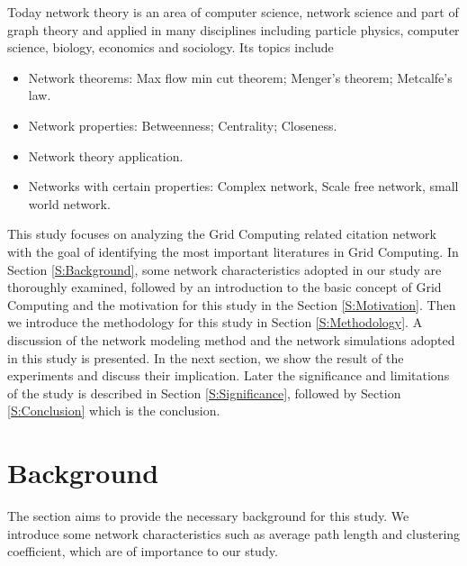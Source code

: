 Today network theory \cite{www-network} is an area of computer science, network science and part of graph theory and applied in many disciplines including particle physics, computer science, biology, economics and sociology. Its topics include

\begin {itemize}
\item Network theorems: Max flow min cut theorem; Menger's theorem; Metcalfe's law.
\item Network properties: Betweenness; Centrality; Closeness.
\item Network theory application.
\item Networks with certain properties: Complex network, Scale free network, small world network. 
\end {itemize}

This study focuses on analyzing the Grid Computing related citation network with the goal of identifying the most important literatures in Grid Computing. In Section \ref{S:Background}, some network characteristics adopted in our study are thoroughly examined, followed by an introduction to the basic concept of Grid Computing and the motivation for this study in the Section \ref{S:Motivation}. Then we introduce the methodology for this study in Section \ref{S:Methodology}. A discussion of the network modeling method and the network simulations adopted in this study is presented.  In the next section, we show the result of the experiments and discuss their implication.  Later the significance and limitations of the study is described in Section \ref{S:Significance}, followed by Section \ref{S:Conclusion} which is the conclusion. 

\section{Background \label{S:Background} }
The section aims to provide the necessary background for this study. We introduce some network characteristics such as average path length and clustering coefficient, which are of importance to our study. 

